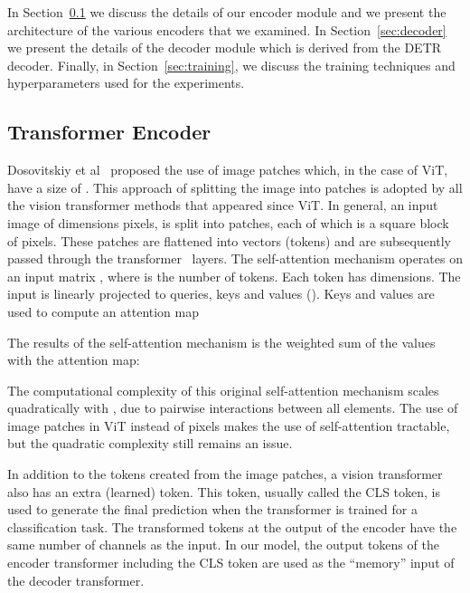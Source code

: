 \documentclass[runningheads]{llncs}
\begin{document}
In Section~\ref{sec:encoder} we discuss the details of our encoder module and 
we present the architecture of the various encoders that we examined. In Section~\ref{sec:decoder} we present the details of the decoder module which is 
derived from the DETR decoder. Finally, in Section~\ref{sec:training},
we discuss the training techniques and hyperparameters used for the experiments.


\subsection{Transformer Encoder}
\label{sec:encoder}
Dosovitskiy et al~\cite{dosovitskiy2020image} proposed the use of image patches which, in the case of ViT, have a size of . This approach of splitting the image into patches 
is adopted by all the vision transformer methods that appeared since ViT.
In general, an input image of dimensions  pixels, is split into  patches, each of which is a square block of  pixels.
These patches are flattened into vectors (tokens) and are subsequently passed through the transformer~\cite{vaswani2017attention} layers.  The self-attention mechanism operates on an input matrix , where  is the number of tokens. Each token has  dimensions.
The input  is linearly projected to queries, keys and values ().
Keys and values are used to compute an attention map 
 
The results of the self-attention mechanism is the weighted sum 
of the values  with the attention map: 

The computational complexity of this original self-attention mechanism scales quadratically with ,  due to pairwise interactions between all  elements. 
The use of image patches in ViT instead of pixels makes the use of self-attention tractable, but 
the quadratic complexity still remains an issue.

In addition to the tokens created from the image patches, a vision transformer also has 
an extra (learned) token. This token, usually called the CLS token, is used to generate 
the final prediction when the transformer is trained for a classification task. 
The transformed tokens at the output of the encoder have the same number of channels as the input.
In our model, the output tokens of the encoder transformer including the 
CLS token are used  as the ``memory'' input of the decoder transformer. 
\end{document}
